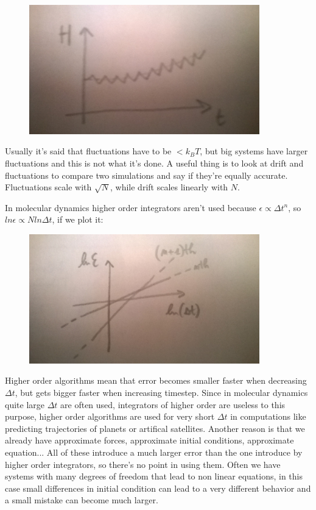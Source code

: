 \documentclass[a4paper, italian, openany]{book}
\begin{document}
\begin{figure}[H]
\centering
\includegraphics[width=100mm]{img/pic7.jpg}
\end{figure}

Usually it's said that fluctuations have to be $< k_B T$, but big systems have larger fluctuations and this is not what it's done.\newline
A useful thing is to look at drift and fluctuations to compare two simulations and say if they're equally accurate.\newline
Fluctuations scale with $\sqrt{N}$, while drift scales linearly with $N$.\newline

In molecular dynamics higher order integrators aren't used because $\epsilon \propto \Delta t^n$, so $ln \epsilon \propto N ln \Delta t$, if we plot it:

\begin{figure}[H]
\centering
\includegraphics[width=100mm]{img/pic8.jpg}
\end{figure}

Higher order algorithms mean that error becomes smaller faster when decreasing $\Delta t $, but gets bigger faster when increasing timestep. Since in molecular dynamics quite large $\Delta t$ are often used, integrators of higher order are useless to this purpose, higher order algorithms are used for very short $\Delta t$ in computations like predicting trajectories of planets or artifical satellites.\newline
Another reason is that we already have approximate forces, approximate initial conditions, approximate equation... All of these introduce a much larger error than the one introduce by higher order integrators, so there's no point in using them.\newline
Often we have systems with many degrees of freedom that lead to non linear equations, in this case small differences in initial condition can lead to a very different behavior and a small mistake can become much larger.
\end{document}
